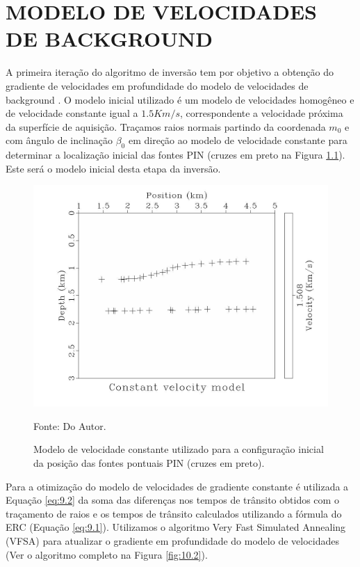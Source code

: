 \chapter{MODELO DE VELOCIDADES DE BACKGROUND}
\label{cap10}

A primeira iteração do algoritmo de inversão tem por objetivo a obtenção do gradiente de
velocidades em profundidade do modelo de velocidades de background \cite{niptomo,stereo}.
O modelo inicial utilizado é um modelo de velocidades homogêneo
e de velocidade constante igual a $1.5Km/s$,
correspondente a velocidade próxima da superfície de aquisição. Traçamos raios normais
partindo da coordenada $m_0$ e com ângulo de inclinação $\beta_0$ em direção ao modelo
de velocidade constante para determinar a localização inicial das fontes PIN (cruzes
em preto na Figura \ref{fig:10.1}). Este será o modelo inicial desta etapa da inversão.

\begin{figure}[H]
\caption{Modelo de velocidade constante utilizado para a configuração inicial da
posição das fontes pontuais PIN (cruzes em preto).}
\begin{center}
\includegraphics[scale=0.3]{images/ctevel.jpeg}
\vspace{-0.3cm}
\end{center}
\begin{center}
 Fonte: Do Autor.
\end{center}
\label{fig:10.1}
\end{figure}

Para a otimização do modelo de velocidades de gradiente constante
é utilizada a Equação \ref{eq:9.2} da soma das
diferenças nos tempos de trânsito obtidos com o traçamento de raios e os tempos de trânsito calculados utilizando a fórmula do ERC (Equação \ref{eq:9.1}). Utilizamos o algoritmo Very Fast Simulated Annealing (VFSA) para atualizar o gradiente em profundidade do modelo de velocidades (Ver o algoritmo completo na
Figura \ref{fig:10.2}).

